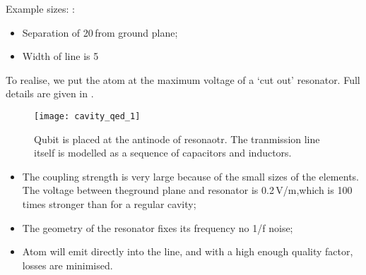\begin{framed}\noindent
  Example sizes: \cite{Peltonen_2018}:
  \begin{itemize}
  \item Separation of 20\,\mum from ground plane;
  \item Width of line is 5\,\mum
  \end{itemize}
\end{framed}


To realise,  we put  the atom at  the maximum voltage  of a  `cut out'
resonator.  Full details are given in \cite{Blais_2004}.

\begin{figure}[h]
  \centering \texttt{[image: cavity\_qed\_1]}
  \caption{Qubit  is  placed  at   the  antinode  of  resonaotr.   The
    tranmission line  itself is modelled  as a sequence  of capacitors
    and inductors.}
\end{figure}

\noindent
\begin{itemize}
\item The coupling  strength is very large because of  the small sizes
  of the elements.  The voltage  between theground plane and resonator
  is 0.2\,V/m,which is 100 times stronger than for a regular cavity;
\item The  geometry of the resonator  fixes its frequency \ira  no 1/f
  noise;
\item Atom  will emit directly into  the line, and with  a high enough
  quality factor, losses are minimised.
\end{itemize}

